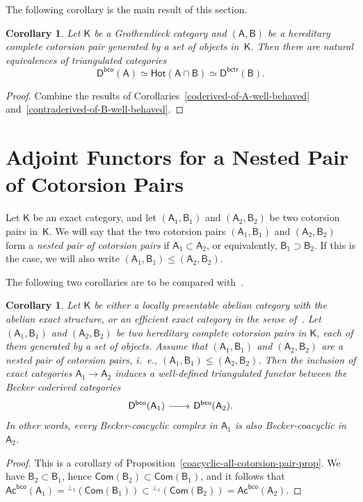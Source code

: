 \documentclass[12pt,a4paper]{amsart}
\newcommand{\+}{\nobreakdash-}
\renewcommand{\:}{\colon}
\newcommand{\rarrow}{\longrightarrow}
\newcommand{\lrarrow}{\mskip.5\thinmuskip\relbar\joinrel\relbar\joinrel
 \rightarrow\mskip.5\thinmuskip\relax}
\newcommand{\sA}{\mathsf A}
\newcommand{\sB}{\mathsf B}
\newcommand{\sD}{\mathsf D}
\newcommand{\sK}{\mathsf K}
\newcommand{\Hot}{\mathsf{Hot}}
\newcommand{\Com}{\mathsf{Com}}
\newcommand{\Ac}{\mathsf{Ac}}
\newcommand{\bco}{\mathsf{bco}}
\newcommand{\bctr}{\mathsf{bctr}}
\newcommand{\Section}[1]{\bigskip\section{#1}\medskip}
\theoremstyle{plain}
\newtheorem{cor}[thm]{Corollary}
\theoremstyle{definition}
\begin{document}
 The following corollary is the main result of this section.

\begin{cor} \label{cotorsion-pair-co-contra-equivalence}
 Let\/ $\sK$ be a Grothendieck category and $(\sA,\sB)$ be a hereditary
complete cotorsion pair generated by a set of objects in\/~$\sK$.
 Then there are natural equivalences of triangulated categories
$$
 \sD^\bco(\sA)\simeq\Hot(\sA\cap\sB)\simeq\sD^\bctr(\sB).
$$
\end{cor}

\begin{proof}
 Combine the results of
Corollaries~\ref{coderived-of-A-well-behaved}
and~\ref{contraderived-of-B-well-behaved}.
\end{proof}


\Section{Adjoint Functors for a Nested Pair of Cotorsion Pairs}

 Let $\sK$ be an exact category, and let $(\sA_1,\sB_1)$ and
$(\sA_2,\sB_2)$ be two cotorsion pairs in~$\sK$.
 We will say that the two cotorsion pairs $(\sA_1,\sB_1)$ and
$(\sA_2,\sB_2)$ form a \emph{nested pair of cotorsion pairs} if
$\sA_1\subset\sA_2$, or equivalently, $\sB_1\supset\sB_2$.
 If this is the case, we will also write
$(\sA_1,\sB_1)\le(\sA_2,\sB_2)$.

 The following two corollaries are to be compared
with~\cite[Lemma~B.7.5]{Pcosh}.

\begin{cor} \label{coderived-A1-to-A2-well-defined}
 Let\/ $\sK$ be either a locally presentable abelian category with
the abelian exact structure, or an efficient exact category in
the sense of\/~\cite{Sto-ICRA}.
 Let $(\sA_1,\sB_1)$ and $(\sA_2,\sB_2)$ be two hereditary complete
cotorsion pairs in\/ $\sK$, each of them generated by a set of objects.
 Assume that $(\sA_1,\sB_1)$ and $(\sA_2,\sB_2)$ are a nested pair of
cotorsion pairs, i.~e., $(\sA_1,\sB_1)\le(\sA_2,\sB_2)$.
 Then the inclusion of exact categories\/ $\sA_1\rarrow\sA_2$ induces
a well-defined triangulated functor between the Becker coderived
categories
$$
 \sD^\bco(\sA_1)\lrarrow\sD^\bco(\sA_2).
$$
 In other words, every Becker-coacyclic complex in\/ $\sA_1$ is also
Becker-coacyclic in\/~$\sA_2$.
\end{cor}

\begin{proof}
 This is a corollary of
Proposition~\ref{coacyclic-all-cotorsion-pair-prop}.
 We have $\sB_2\subset\sB_1$, hence $\Com(\sB_2)\subset\Com(\sB_1)$,
and it follows that $\Ac^\bco(\sA_1)={}^{\perp_1}(\Com(\sB_1))
\subset{}^{\perp_1}(\Com(\sB_2))=\Ac^\bco(\sA_2)$.
\end{proof}
\end{document}
